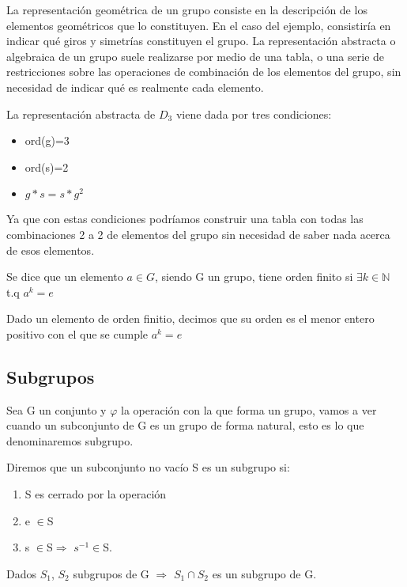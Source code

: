 \documentclass[a4paper,10pt]{apuntes}
\begin{document}
 La representación geométrica de un grupo consiste en la descripción de los elementos geométricos que lo constituyen. En el 
 caso del ejemplo, consistiría en indicar qué giros y simetrías constituyen el grupo.
 La representación abstracta o algebraica de un grupo suele realizarse por medio de una tabla, o una serie de restricciones sobre las operaciones
 de combinación de los elementos del grupo, sin necesidad de indicar qué es realmente cada elemento.
 \begin{example}
  La representación abstracta de $D_{3}$  viene dada por tres condiciones:
 \begin{itemize}
  \item ord(g)=3
  \item ord(s)=2
  \item $g*s=s*g^{2}$
 \end{itemize}
 Ya que con estas condiciones podríamos construir una tabla con todas las combinaciones 2 a 2 de elementos del grupo sin necesidad
 de saber nada acerca de esos elementos.
 \end{example}
 
 \begin{defn}
  Se dice que un elemento $a\in G$, siendo G un grupo, tiene orden finito si $\exists k\in\mathds{N}$  t.q  $a^{k}=e$
 \end{defn}
 
 \begin{defn}
  Dado un elemento de orden finitio, decimos que su orden es el menor entero positivo con el que se cumple $a^{k}=e$
 \end{defn}
\subsection{Subgrupos}
 Sea G un conjunto y $\varphi$  la operación con la que forma un grupo, vamos a ver cuando un subconjunto de G es un grupo de forma natural,
 esto es lo que denominaremos subgrupo.
 
 \begin{defn}
  Diremos que un subconjunto no vacío S es un subgrupo si:
  \begin{enumerate}
   \item S es cerrado por la operación
   \item e $\in$S
   \item s $\in$S$\Rightarrow$ $s^{-1}\in$S.
  \end{enumerate}
 \end{defn}
  \begin{theorem}
   Dados $S_{1}$, $S_{2}$ subgrupos de G $\Rightarrow$  $S_{1}\cap S_{2}$  es un subgrupo de G.
  \end{theorem}
\end{document}
